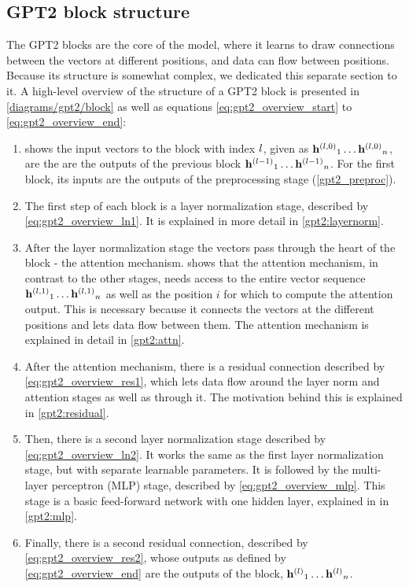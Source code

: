 \subsection{GPT2 block structure}
\label{gpt2:block}

The GPT2 blocks are the core of the model, where it learns to draw connections between the vectors at different positions, and data can flow between positions.
Because its structure is somewhat complex, we dedicated this separate section to it.
A high-level overview of the structure of a GPT2 block is presented in \cref{diagrams/gpt2/block} as well as equations \eqref{eq:gpt2_overview_start} to \eqref{eq:gpt2_overview_end}:

\begin{enumerate}
	\item {} shows the input vectors to the block with index ${l}$, given as ${{\mathbf{h}}^{(l, 0)}}_1 \ldots {{\mathbf{h}}^{(l, 0)}}_n$, are the are the outputs of the previous block ${{\mathbf{h}}^{(l-1)}}_1 \ldots {{\mathbf{h}}^{(l-1)}}_n$. For the first block, its inputs are the outputs of the preprocessing stage (\cref{gpt2_preproc}).
	
	\item The first step of each block is a layer normalization stage, described by \cref{eq:gpt2_overview_ln1}. It is explained in more detail in \cref{gpt2:layernorm}.
	
	\item After the layer normalization stage the vectors pass through the heart of the block - the attention mechanism.  shows that the attention mechanism, in contrast to the other stages, needs access to the entire vector sequence ${{\mathbf{h}}^{(l, 1)}}_1 \ldots {{\mathbf{h}}^{(l, 1)}}_n$ as well as the position $i$ for which to compute the attention output. This is necessary because it connects the vectors at the different positions and lets data flow between them. The attention mechanism is explained in detail in \cref{gpt2:attn}.
	
	\item After the attention mechanism, there is a residual connection described by \cref{eq:gpt2_overview_res1}, which lets data flow around the layer norm and attention stages as well as through it. The motivation behind this is explained in \cref{gpt2:residual}.
	
	\item Then, there is a second layer normalization stage described by \cref{eq:gpt2_overview_ln2}. It works the same as the first layer normalization stage, but with separate learnable parameters. It is followed by the multi-layer perceptron (MLP) stage, described by \cref{eq:gpt2_overview_mlp}. This stage is a basic feed-forward network with one hidden layer, explained in in \cref{gpt2:mlp}.
	
	\item Finally, there is a second residual connection, described by \cref{eq:gpt2_overview_res2}, whose outputs as defined by \cref{eq:gpt2_overview_end} are the outputs of the block, ${{\mathbf{h}}^{(l)}}_1 \ldots {{\mathbf{h}}^{(l)}}_n$.
\end{enumerate}


